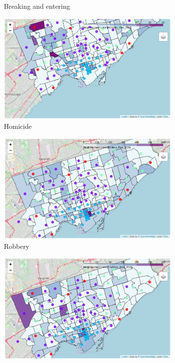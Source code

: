 \documentclass{article}
\begin{document}
\begin{figure}[ht]
\begin{subfigure}[b]{0.47\textwidth}
         \caption{Breaking and entering}
     \end{subfigure}
     \hfill
     \begin{subfigure}[b]{0.47\textwidth}
         \centering
         \includegraphics[width=\textwidth]{pics/homicide}
         \caption{Homicide}
     \end{subfigure}
     \begin{subfigure}[b]{0.47\textwidth}
         \centering
         \includegraphics[width=\textwidth]{pics/robbery}
         \caption{Robbery}
     \end{subfigure}
     \hfill
     \begin{subfigure}[b]{0.47\textwidth}
         \centering
         \includegraphics[width=\textwidth]{pics/theftover}

\end{subfigure}
\end{figure}
\end{document}
